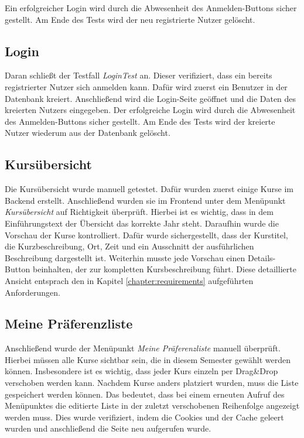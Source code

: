 			Ein erfolgreicher Login wird durch die Abwesenheit des \glqq Anmelden\grqq -Buttons sicher gestellt.
			Am Ende des Tests wird der neu registrierte Nutzer gelöscht.
		
		\subsection{Login}
			Daran schließt der Testfall \textit{LoginTest} an.
			Dieser verifiziert, dass ein bereits registrierter Nutzer sich anmelden kann.
			Dafür wird zuerst ein Benutzer in der Datenbank kreiert.
			Anschließend wird die Login-Seite geöffnet und die Daten des kreierten Nutzers eingegeben.
			Der erfolgreiche Login wird durch die Abwesenheit des \glqq Anmelden\grqq -Buttons sicher gestellt.
			Am Ende des Tests wird der kreierte Nutzer wiederum aus der Datenbank gelöscht.
		
		\subsection{Kursübersicht}
			Die Kursübersicht wurde manuell getestet.
			Dafür wurden zuerst einige Kurse im Backend erstellt.
			Anschließend wurden sie im Frontend unter dem Menüpunkt \textit{Kursübersicht} auf Richtigkeit überprüft.
			Hierbei ist es wichtig, dass in dem Einführungstext der Übersicht das korrekte Jahr steht.
			Daraufhin wurde die Vorschau der Kurse kontrolliert.
			Dafür wurde sichergestellt, dass der Kurstitel, die Kurzbeschreibung, Ort, Zeit und ein Ausschnitt der ausführlichen Beschreibung dargestellt ist.
			Weiterhin musste jede Vorschau einen \glqq Details\grqq -Button beinhalten, der zur kompletten Kursbeschreibung führt.
			Diese detaillierte Ansicht entsprach den in Kapitel \ref{chapter:requirements} aufgeführten Anforderungen.
		
		\subsection{Meine Präferenzliste}
			Anschließend wurde der Menüpunkt \textit{Meine Präferenzliste} manuell überprüft.
			Hierbei müssen alle Kurse sichtbar sein, die in diesem Semester gewählt werden können.
			Insbesondere ist es wichtig, dass jeder Kurs einzeln per Drag\&Drop verschoben werden kann.
			Nachdem Kurse anders platziert wurden, muss die Liste gespeichert werden können.
            Das bedeutet, dass bei einem erneuten Aufruf des Menüpunktes die editierte Liste in der zuletzt verschobenen Reihenfolge angezeigt werden muss.
			Dies wurde verifiziert, indem die Cookies und der Cache geleert wurden und anschließend die Seite neu aufgerufen wurde.
		
